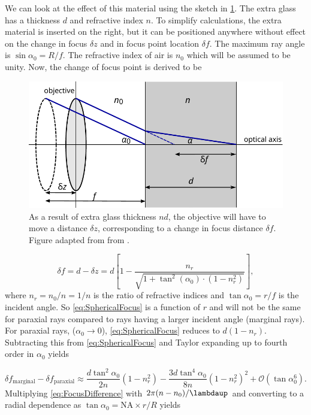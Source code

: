 We can look at the effect of this material using the sketch in \cref{fig:SphericalSketch}. The extra glass has a thickness $d$ and refractive index $n$. 
To simplify calculations, the extra material is inserted on the right, but it can be positioned anywhere without effect on the change in focus $\delta z$ and in focus point location $\delta f$. The maximum ray angle is $\sin{\alpha_0} = R/f$. The refractive index of air is $n_0$ which will be assumed to be unity.
Now, the change of focus point is derived to be \cite{Iwaniuk2011}

\begin{figure}
    \centering
    \includegraphics[width=0.65\linewidth]{figures/sphericalAberration.pdf}
    \caption{As a result of extra glass thickness $nd$, the objective will have to move a distance $\delta z$, corresponding to a change in focus distance $\delta f$.
    Figure adapted from from \cite{Iwaniuk2011}.}
    \label{fig:SphericalSketch}
\end{figure}


\begin{equation}\label{eq:SphericalFocus}
    \delta f = d - \delta z = d \left[
    1 - \frac{n_r}{\sqrt{1+\tan^2{(\alpha_0)}\cdot(1-n_r^2)}}
    \right],
\end{equation}
where $n_r=n_0/n=1/n$ is the ratio of refractive indices and $\tan{\alpha_0} = r/f$ is the incident angle. 
So \cref{eq:SphericalFocus} is a function of $r$ and will not be the same for paraxial rays compared to rays having a larger incident angle (marginal rays). 
For paraxial rays, ($\alpha_0 \rightarrow 0$), \cref{eq:SphericalFocus} reduces to $d(1-n_r)$. 
Subtracting this from \cref{eq:SphericalFocus} and Taylor expanding up to fourth order in $\alpha_0$ yields 

\begin{equation}\label{eq:FocusDifference}
    \delta f_{\text{marginal}} - \delta f_{\text{paraxial}} \approx
    \frac{d \tan^2{\alpha_0}}{2n} (1-n_r^2) - \frac{3d \tan^4{\alpha_0}}{8n}(1-n_r^2)^2+\mathcal{O}(\tan\alpha_0^6).
\end{equation}
Multiplying \cref{eq:FocusDifference} with $2\pi(n-n_0)/\lambdaup$ and converting to a radial dependence as $\tan{\alpha_0}= \text{NA} \times r/R$ yields \cite{Iwaniuk2011}

